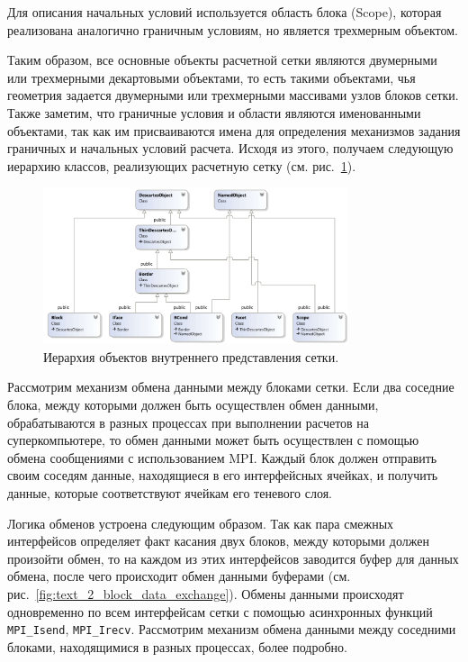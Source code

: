 Для описания начальных условий используется область блока (Scope), которая реализована аналогично граничным условиям, но является трехмерным объектом.

Таким образом, все основные объекты расчетной сетки являются двумерными или трехмерными декартовыми объектами, то есть такими объектами, чья геометрия задается двумерными или трехмерными массивами узлов блоков сетки.
Также заметим, что граничные условия и области являются именованными объектами, так как им присваиваются имена для определения механизмов задания граничных и начальных условий расчета.
Исходя из этого, получаем следующую иерархию классов, реализующих расчетную сетку (см. рис.~\ref{fig:text_2_block_hierarchy}).

\begin{figure}[ht]
\centering
\includegraphics[width=0.8\textwidth]{fig/par_9-hierarchy.png}
\singlespacing
{}\caption{Иерархия объектов внутреннего представления сетки.}
\label{fig:text_2_block_hierarchy}
\end{figure}

Рассмотрим механизм обмена данными между блоками сетки.
Если два соседние блока, между которыми должен быть осуществлен обмен данными, обрабатываются в разных процессах при выполнении расчетов на суперкомпьютере, то обмен данными может быть осуществлен с помощью обмена сообщениями с использованием MPI\label{abbr:mpi-2}.
Каждый блок должен отправить своим соседям данные, находящиеся в его интерфейсных ячейках, и получить данные, которые соответствуют ячейкам его теневого слоя.

Логика обменов устроена следующим образом.
Так как пара смежных интерфейсов определяет факт касания двух блоков, между которыми должен произойти обмен, то на каждом из этих интерфейсов заводится буфер для данных обмена, после чего происходит обмен данными буферами (см. рис.~\ref{fig:text_2_block_data_exchange}).
Обмены данными происходят одновременно по всем интерфейсам сетки с помощью асинхронных функций
\texttt{MPI\_Isend}, \texttt{MPI\_Irecv}.
Рассмотрим механизм обмена данными между соседними блоками, находящимися в разных процессах, более подробно.

